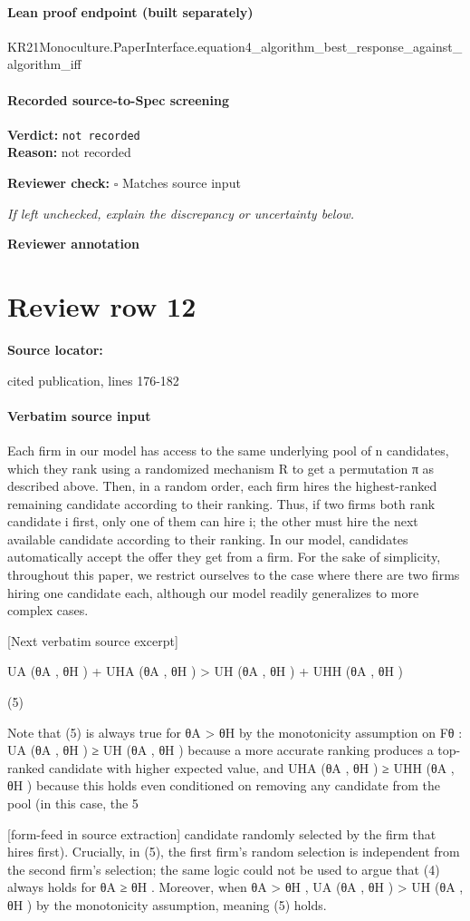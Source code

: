 \documentclass[10pt]{article}
\newcommand{\reviewerbox}{%
  \par\noindent\fbox{\parbox{0.96\linewidth}{\rule{0pt}{0.38in}}}\par
}
\newcommand{\reviewmatch}[1]{%
  \par\noindent\textbf{Reviewer check:} $\square$\; #1\par
  \noindent\emph{If left unchecked, explain the discrepancy or uncertainty below.}\par
}
\begin{document}
\paragraph{Lean proof endpoint (built separately)}\begin{ReviewVerbatim}
KR21Monoculture.PaperInterface.equation4_algorithm_best_response_against_algorithm_iff
\end{ReviewVerbatim}

\paragraph{Recorded source-to-Spec screening}
\textbf{Verdict:} \texttt{not recorded}
\\
\textbf{Reason:} not recorded
\reviewmatch{Matches source input}
\noindent\textbf{Reviewer annotation}\par
\reviewerbox
\clearpage
\hypertarget{source-claim-9d6309ccb42ce9df}{}
\section*{Review row 12}
\textbf{Source locator:} {\footnotesize\raggedright cited publication, lines 176-\allowbreak{}182\par}
\paragraph{Verbatim source input}
\begin{ReviewVerbatim}
Each firm in our model has access to the same underlying pool of n candidates, which they rank using
a randomized mechanism R to get a permutation π as described above. Then, in a random order, each
firm hires the highest-ranked remaining candidate according to their ranking. Thus, if two firms both rank
candidate i first, only one of them can hire i; the other must hire the next available candidate according to
their ranking. In our model, candidates automatically accept the offer they get from a firm. For the sake
of simplicity, throughout this paper, we restrict ourselves to the case where there are two firms hiring one
candidate each, although our model readily generalizes to more complex cases.

[Next verbatim source excerpt]


UA (θA , θH ) + UHA (θA , θH ) > UH (θA , θH ) + UHH (θA , θH )

(5)

Note that (5) is always true for θA > θH by the monotonicity assumption on Fθ : UA (θA , θH ) ≥ UH (θA , θH )
because a more accurate ranking produces a top-ranked candidate with higher expected value, and UHA (θA , θH ) ≥
UHH (θA , θH ) because this holds even conditioned on removing any candidate from the pool (in this case, the
5


[form-feed in source extraction]
candidate randomly selected by the firm that hires first). Crucially, in (5), the first firm’s random selection
is independent from the second firm’s selection; the same logic could not be used to argue that (4) always
holds for θA ≥ θH . Moreover, when θA > θH , UA (θA , θH ) > UH (θA , θH ) by the monotonicity assumption,
meaning (5) holds.
\end{ReviewVerbatim}
\end{document}

